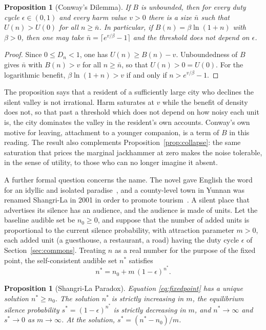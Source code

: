\documentclass[11pt]{article}
\newtheorem{proposition}[theorem]{Proposition}
\theoremstyle{definition}
\theoremstyle{remark}
\begin{document}
\begin{proposition}[Conway's Dilemma]\label{prop:conway}
If $B$ is unbounded, then for every duty cycle $\epsilon\in(0,1)$ and every harm value $v>0$ there is a size $\bar n$ such that $U(n)>U(0)$ for all $n\ge\bar n$. In particular, if $B(n)=\beta\ln(1+n)$ with $\beta>0$, then one may take $\bar n = \lceil e^{v/\beta}-1\rceil$ and the threshold does not depend on $\epsilon$.
\end{proposition}

\begin{proof}
Since $0\le D_n<1$, one has $U(n)\ge B(n)-v$. Unboundedness of $B$ gives $\bar n$ with $B(n)>v$ for all $n\ge\bar n$, so that $U(n)>0=U(0)$. For the logarithmic benefit, $\beta\ln(1+n)>v$ if and only if $n>e^{v/\beta}-1$.
\end{proof}

The proposition says that a resident of a sufficiently large city who declines the silent valley is not irrational. Harm saturates at $v$ while the benefit of density does not, so that past a threshold which does not depend on how noisy each unit is, the city dominates the valley in the resident's own accounts. Conway's own motive for leaving, attachment to a younger companion, is a term of $B$ in this reading. The result also complements Proposition~\ref{prop:collapse}: the same saturation that prices the marginal jackhammer at zero makes the noise tolerable, in the sense of utility, to those who can no longer imagine it absent.

A further formal question concerns the name. The novel gave English the word for an idyllic and isolated paradise~\cite{wikishangrila}, and a county-level town in Yunnan was renamed Shangri-La in 2001 in order to promote tourism~\cite{wikishangrila}. A silent place that advertises its silence has an audience, and the audience is made of units. Let the baseline audible set be $n_0\ge0$, and suppose that the number of added units is proportional to the current silence probability, with attraction parameter $m>0$, each added unit (a guesthouse, a restaurant, a road) having the duty cycle $\epsilon$ of Section~\ref{sec:commons}. Treating $n$ as a real number for the purpose of the fixed point, the self-consistent audible set $n^*$ satisfies
\begin{equation}\label{eq:fixedpoint}
n^* = n_0 + m\,(1-\epsilon)^{n^*}.
\end{equation}

\begin{proposition}[Shangri-La Paradox]\label{prop:paradox}
Equation \eqref{eq:fixedpoint} has a unique solution $n^*\ge n_0$. The solution $n^*$ is strictly increasing in $m$, the equilibrium silence probability $s^*=(1-\epsilon)^{n^*}$ is strictly decreasing in $m$, and $n^*\to\infty$ and $s^*\to0$ as $m\to\infty$. At the solution, $s^*=(n^*-n_0)/m$.
\end{proposition}
\end{document}
